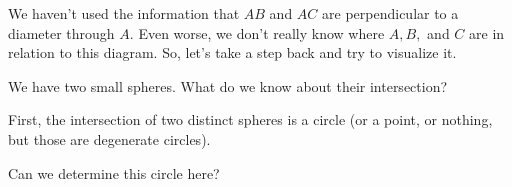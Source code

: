 

We haven't used the information that $AB$ and $AC$ are perpendicular to a diameter through $A.$ Even worse, we don't really know where $A, B,$ and $C$ are in relation to this diagram. So, let's take a step back and try to visualize it.

We have two small spheres. What do we know about their intersection?





First, the intersection of two distinct spheres is a circle (or a point, or nothing, but those are degenerate circles).

Can we determine this circle here?









